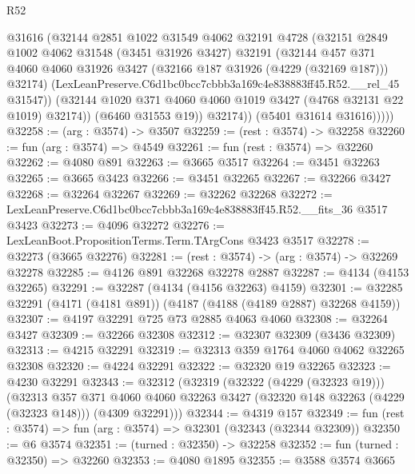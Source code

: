 \begin{lexlean}{R52}
\begin{coremodule}
                  @31616
                  (@32144
                    @2851
                    @1022
                    @31549
                    @4062
                    @32191
                    @4728
                    (@32151
                      @2849
                      @1002
                      @4062
                      @31548
                      (@3451 @31926 @3427)
                      @32191
                      (@32144
                        @457
                        @371
                        @4060
                        @4060
                        @31926
                        @3427
                        (@32166 @187 @31926 (@4229 (@32169 @187)))
                        @32174)
                      (LexLeanPreserve.C6d1bc0bcc7cbbb3a169c4e838883ff45.R52.__rel_45 @31547))
                    (@32144 @1020 @371 @4060 @4060 @1019 @3427 (@4768 @32131 @22 @1019) @32174))
                  (@6460 @31553 @19))
                @32174))
            (@5401 @31614 @31616)))))
@32258 := (arg : @3574) -> @3507
@32259 := (rest : @3574) -> @32258
@32260 := fun (arg : @3574) => @4549
@32261 := fun (rest : @3574) => @32260
@32262 := @4080 @891
@32263 := @3665 @3517
@32264 := @3451 @32263
@32265 := @3665 @3423
@32266 := @3451 @32265
@32267 := @32266 @3427
@32268 := @32264 @32267
@32269 := @32262 @32268
@32272 := LexLeanPreserve.C6d1bc0bcc7cbbb3a169c4e838883ff45.R52.__fits_36 @3517 @3423
@32273 := @4096 @32272
@32276 := LexLeanBoot.PropositionTerms.Term.TArgCons @3423 @3517
@32278 := @32273 (@3665 @32276)
@32281 := (rest : @3574) -> (arg : @3574) -> @32269 @32278
@32285 := @4126 @891 @32268 @32278 @2887
@32287 := @4134 (@4153 @32265)
@32291 := @32287 (@4134 (@4156 @32263) @4159)
@32301 := @32285 @32291 (@4171 (@4181 @891)) (@4187 (@4188 (@4189 @2887) @32268 @4159))
@32307 := @4197 @32291 @725 @73 @2885 @4063 @4060
@32308 := @32264 @3427
@32309 := @32266 @32308
@32312 := @32307 @32309 (@3436 @32309)
@32313 := @4215 @32291
@32319 := @32313 @359 @1764 @4060 @4062 @32265 @32308
@32320 := @4224 @32291
@32322 := @32320 @19 @32265
@32323 := @4230 @32291
@32343 := @32312
    (@32319
      (@32322 (@4229 (@32323 @19)))
      (@32313
        @357
        @371
        @4060
        @4060
        @32263
        @3427
        (@32320 @148 @32263 (@4229 (@32323 @148)))
        (@4309 @32291)))
@32344 := @4319 @157
@32349 := fun (rest : @3574) => fun (arg : @3574) => @32301 (@32343 (@32344 @32309))
@32350 := @6 @3574
@32351 := (turned : @32350) -> @32258
@32352 := fun (turned : @32350) => @32260
@32353 := @4080 @1895
@32355 := @3588 @3574 @3665

\end{coremodule}
\end{lexlean}
